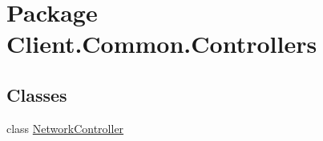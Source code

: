\hypertarget{namespaceClient_1_1Common_1_1Controllers}{\section{Package Client.\-Common.\-Controllers}
\label{namespaceClient_1_1Common_1_1Controllers}
}
\subsection*{Classes}
\begin{DoxyCompactItemize}
\item 
class \hyperlink{classClient_1_1Common_1_1Controllers_1_1NetworkController}{Network\-Controller}
\end{DoxyCompactItemize}
